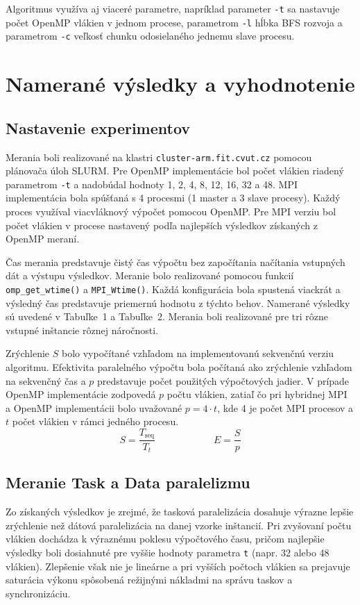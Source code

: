 \documentclass[a4paper]{article}
\begin{document}
Algoritmus využíva aj viaceré parametre, napríklad parameter \texttt{-t} sa nastavuje počet OpenMP vlákien v jednom procese, parametrom \texttt{-l} hĺbka BFS rozvoja a parametrom \texttt{-c} veľkosť chunku odosielaného jednemu slave procesu.


\section{Namerané výsledky a vyhodnotenie}

\subsection{Nastavenie experimentov}

Merania boli realizované na klastri \texttt{cluster-arm.fit.cvut.cz} pomocou plánovača úloh SLURM.
Pre OpenMP implementácie bol počet vlákien riadený parametrom \texttt{-t} a nadobúdal hodnoty 1, 2, 4, 8, 12, 16, 32 a 48.
MPI implementácia bola spúšťaná s 4 procesmi (1 master a 3 slave procesy). Každý proces využíval viacvláknový výpočet pomocou OpenMP.
Pre MPI verziu bol počet vlákien v procese nastavený podľa najlepších výsledkov získaných z OpenMP meraní.

Čas merania predstavuje čistý čas výpočtu bez započítania načítania vstupných dát a výstupu výsledkov. Meranie bolo realizované pomocou funkcií \texttt{omp\_get\_wtime()} a \texttt{MPI\_Wtime()}.
Každá konfigurácia bola spustená viackrát a výsledný čas predstavuje priemernú hodnotu z týchto behov.
Namerané výsledky sú uvedené v Tabuľke~1 a Tabuľke~2. Merania boli realizované pre tri rôzne vstupné inštancie rôznej náročnosti.

Zrýchlenie $S$ bolo vypočítané vzhľadom na implementovanú sekvenčnú verziu algoritmu.
Efektivita paralelného výpočtu bola počítaná ako zrýchlenie vzhľadom na sekvenčný čas a $p$ predstavuje počet použitých výpočtových jadier. 
V prípade OpenMP implementácie zodpovedá $p$ počtu vlákien, zatiaľ čo pri hybridnej MPI a OpenMP implementácii bolo uvažované $p = 4 \cdot t$, kde 4 je počet MPI procesov a $t$ počet vlákien v rámci jedného procesu.
$$
S=\frac{T_{\mathrm{seq}}}{T_t} \qquad \qquad \qquad E = \frac{S}{p}
$$

\subsection{Meranie Task a Data paralelizmu}
Zo získaných výsledkov je zrejmé, že tasková paralelizácia dosahuje výrazne lepšie zrýchlenie než dátová paralelizácia na danej vzorke inštancií. 
Pri zvyšovaní počtu vlákien dochádza k výraznému poklesu výpočtového času, pričom najlepšie výsledky boli dosiahnuté pre vyššie hodnoty parametra \texttt{t} (napr. 32 alebo 48 vlákien). 
Zlepšenie však nie je lineárne a pri vyšších počtoch vlákien sa prejavuje saturácia výkonu spôsobená režijnými nákladmi na správu taskov a synchronizáciu.
\end{document}

